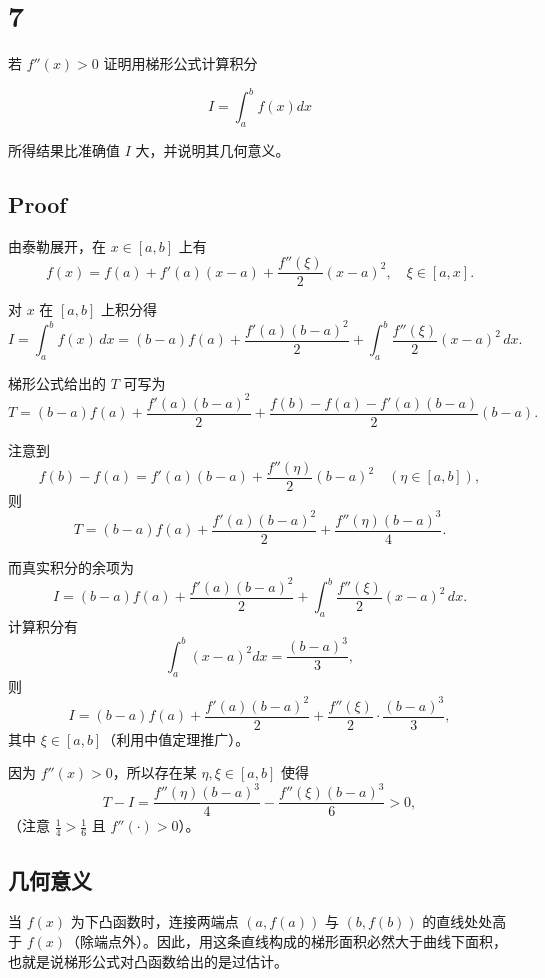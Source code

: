 \documentclass[11pt]{article}
\begin{document}
    \section{7}\label{section}

若 \(f''(x) > 0\) 证明用梯形公式计算积分

\[
I = \int_a^b f(x) dx
\]

所得结果比准确值 \(I\) 大，并说明其几何意义。

\subsection{Proof}\label{proof}

由泰勒展开，在 \(x \in [a,b]\) 上有\\
\[
f(x)=f(a)+f'(a)(x-a)+\frac{f''(\xi)}{2}(x-a)^2,\quad \xi\in[a,x].
\]

对 \(x\) 在 \([a,b]\) 上积分得\\
\[
I = \int_a^b f(x)\,dx = (b-a)f(a)+\frac{f'(a)(b-a)^2}{2}+\int_a^b \frac{f''(\xi)}{2}(x-a)^2\,dx.
\]

梯形公式给出的 \(T\) 可写为\\
\[
T = (b-a)f(a)+\frac{f'(a)(b-a)^2}{2}+\frac{f(b)-f(a)-f'(a)(b-a)}{2}(b-a).
\]

注意到\\
\[
f(b)-f(a)=f'(a)(b-a)+\frac{f''(\eta)}{2}(b-a)^2 \quad (\eta\in[a,b]),
\] 则\\
\[
T = (b-a)f(a)+\frac{f'(a)(b-a)^2}{2}+\frac{f''(\eta)(b-a)^3}{4}.
\]

而真实积分的余项为\\
\[
I = (b-a)f(a)+\frac{f'(a)(b-a)^2}{2}+\int_a^b \frac{f''(\xi)}{2}(x-a)^2\,dx.
\] 计算积分有\\
\[
\int_a^b (x-a)^2 dx = \frac{(b-a)^3}{3},
\] 则\\
\[
I = (b-a)f(a)+\frac{f'(a)(b-a)^2}{2}+\frac{f''(\xi)}{2}\cdot\frac{(b-a)^3}{3},
\] 其中 \(\xi \in [a,b]\)（利用中值定理推广）。

因为 \(f''(x)>0\)，所以存在某 \(\eta, \xi \in [a,b]\) 使得\\
\[
T - I = \frac{f''(\eta)(b-a)^3}{4} - \frac{f''(\xi)(b-a)^3}{6} > 0,
\] （注意 \(\frac{1}{4}>\frac{1}{6}\) 且 \(f''(\cdot)>0\)）。

\subsection{几何意义}\label{ux51e0ux4f55ux610fux4e49}

当 \(f(x)\) 为下凸函数时，连接两端点 \((a,f(a))\) 与 \((b,f(b))\)
的直线处处高于
\(f(x)\)（除端点外）。因此，用这条直线构成的梯形面积必然大于曲线下面积，也就是说梯形公式对凸函数给出的是过估计。
\end{document}

